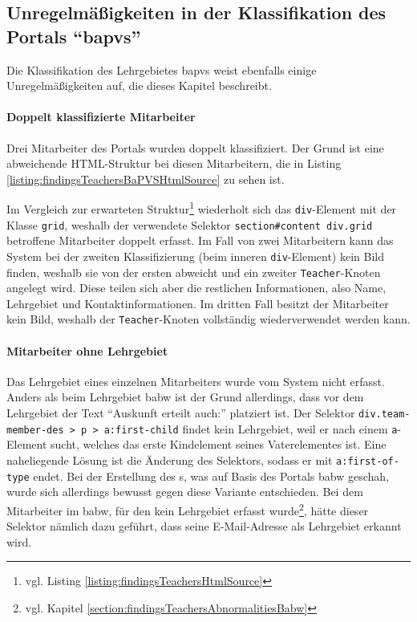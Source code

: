 \subsection{Unregelmäßigkeiten in der Klassifikation des Portals "`\acrshort{bapvs}"'}
    \label{section:findingsTeachersAbnormalitiesBaPVS}
    Die Klassifikation des Lehrgebietes \gls{bapvs}
    weist ebenfalls einige Unregelmäßigkeiten auf,
    die dieses Kapitel beschreibt.

    \paragraph{Doppelt klassifizierte Mitarbeiter}
    Drei Mitarbeiter des Portals wurden doppelt klassifiziert.
    Der Grund ist eine abweichende HTML-Struktur bei diesen Mitarbeitern,
    die in Listing \ref{listing:findingsTeachersBaPVSHtmlSource} zu sehen ist.

    

    Im Vergleich zur erwarteten Struktur\footnote{vgl. Listing \ref{listing:findingsTeachersHtmlSource}} wiederholt sich
    das \texttt{div}-Element mit der Klasse \texttt{grid},
    weshalb der verwendete Selektor \texttt{section\#content div.grid}
    betroffene Mitarbeiter doppelt erfasst.
    Im Fall von zwei Mitarbeitern kann das System bei der zweiten Klassifizierung
    (beim inneren \texttt{div}-Element) kein Bild finden,
    weshalb sie von der ersten abweicht und ein zweiter \texttt{Teacher}-Knoten angelegt wird.
    Diese teilen sich aber die restlichen Informationen,
    also Name, Lehrgebiet und Kontaktinformationen.
    Im dritten Fall besitzt der Mitarbeiter kein Bild,
    weshalb der \texttt{Teacher}-Knoten vollständig wiederverwendet werden kann.

    \paragraph{Mitarbeiter ohne Lehrgebiet}
    Das Lehrgebiet eines einzelnen Mitarbeiters wurde vom System nicht erfasst.
    Anders als beim Lehrgebiet \gls{babw} ist der Grund allerdings,
    dass vor dem Lehrgebiet der Text "`Auskunft erteilt auch:"' platziert ist.
    Der Selektor \texttt{div.team-member-des > p > a:first-child} findet
    kein Lehrgebiet, weil er nach einem \texttt{a}-Element sucht,
    welches das erste Kindelement seines Vaterelementes ist.
    Eine naheliegende Lösung ist die Änderung des Selektors,
    sodass er mit \texttt{a:first-of-type} endet.
    Bei der Erstellung des {\classificationModel}s,
    was auf Basis des Portals \gls{babw} geschah,
    wurde sich allerdings bewusst gegen diese Variante entschieden.
    Bei dem Mitarbeiter im \gls{babw}, für den kein Lehrgebiet erfasst
    wurde\footnote{vgl. Kapitel \ref{section:findingsTeachersAbnormalitiesBabw}},
    hätte dieser Selektor nämlich dazu geführt,
    dass seine E-Mail-Adresse als Lehrgebiet erkannt wird.

